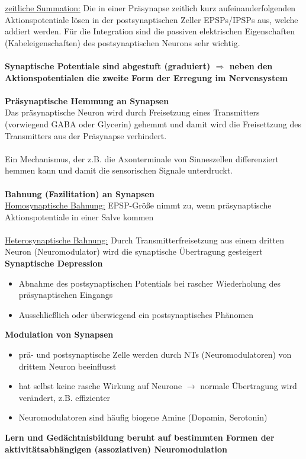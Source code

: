 \underline{zeitliche Summation:} Die in einer Präsynapse zeitlich kurz aufeinanderfolgenden Aktionspotentiale lösen in der postsynaptischen Zeller EPSPs/IPSPs aus, welche addiert werden.
Für die Integration sind die passiven elektrischen Eigenschaften (Kabeleigenschaften) des postsynaptischen Neurons sehr wichtig.\\\\

\textbf{Synaptische Potentiale sind abgestuft (graduiert) $\Rightarrow$ neben den Aktionspotentialen die zweite Form der Erregung im Nervensystem}
\\\\
\textbf{Präsynaptische Hemmung an Synapsen}\\
Das präsynaptische Neuron wird durch Freisetzung eines Transmitters (vorwiegend GABA oder Glycerin) gehemmt und damit wird die Freisettzung des Transmitters aus der Präsynapse verhindert.\\\\
Ein Mechanismus, der z.B. die Axonterminale von Sinneszellen differenziert hemmen kann und damit die sensorischen Signale unterdruckt.
\\\\
\textbf{Bahnung (Fazilitation) an Synapsen}\\
\underline{Homosynaptische Bahnung:} EPSP-Größe nimmt zu, wenn präsynaptische Aktionspotentiale in einer Salve kommen
\\\\
\underline{Heterosynaptische Bahnung:} Durch Transmitterfreisetzung aus einem dritten Neuron (Neuromodulator) wird die synaptische Übertragung gesteigert\\

\textbf{Synaptische Depression}
\begin{itemize}
	\item Abnahme des postsynaptischen Potentials bei rascher Wiederholung des präsynaptischen Eingangs
	\item Ausschließlich oder überwiegend ein postsynaptisches Phänomen
\end{itemize}

\textbf{Modulation von Synapsen}
\begin{itemize}
	\item prä- und postsynaptische Zelle werden durch NTs (Neuromodulatoren) von drittem Neuron beeinflusst
	\item hat selbst keine rasche Wirkung auf Neurone $\rightarrow$ normale Übertragung wird verändert, z.B. effizienter
	\item Neuromodulatoren sind häufig biogene Amine (Dopamin, Serotonin)
\end{itemize}

\textbf{Lern und Gedächtnisbildung beruht auf bestimmten Formen der aktivitätsabhängigen (assoziativen) Neuromodulation}